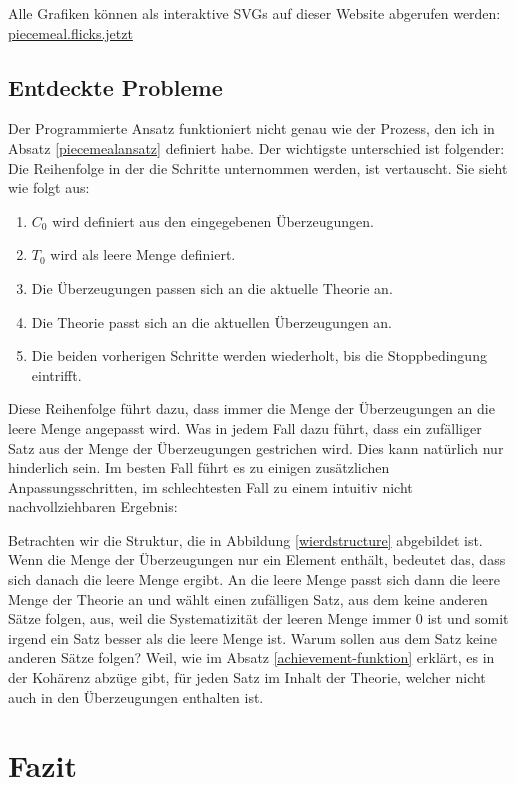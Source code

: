 \documentclass{article}
\begin{document}
Alle Grafiken können als interaktive SVGs auf dieser Website abgerufen werden: \href{https://piecemeal.flicks.jetzt/}{piecemeal.flicks.jetzt}

\subsection{Entdeckte Probleme}
Der Programmierte Ansatz funktioniert nicht genau wie der Prozess, den ich in Absatz \ref{piecemealansatz} definiert habe. Der wichtigste unterschied ist folgender: Die Reihenfolge in der die Schritte unternommen werden, ist vertauscht. Sie sieht wie folgt aus:
\begin{enumerate}
    \item $C_0$ wird definiert aus den eingegebenen Überzeugungen.
    \item $T_0$ wird als leere Menge definiert.
    \item Die Überzeugungen passen sich an die aktuelle Theorie an.
    \item Die Theorie passt sich an die aktuellen Überzeugungen an.
    \item Die beiden vorherigen Schritte werden wiederholt, bis die Stoppbedingung eintrifft.
\end{enumerate}

Diese Reihenfolge führt dazu, dass immer die Menge der Überzeugungen an die leere Menge angepasst wird. Was in jedem Fall dazu führt, dass ein zufälliger Satz aus der Menge der Überzeugungen gestrichen wird. Dies kann natürlich nur hinderlich sein. Im besten Fall führt es zu einigen zusätzlichen Anpassungsschritten, im schlechtesten Fall zu einem intuitiv nicht nachvollziehbaren Ergebnis:

Betrachten wir die Struktur, die in Abbildung \ref{wierdstructure} abgebildet ist. Wenn die Menge der Überzeugungen nur ein Element enthält, bedeutet das, dass sich danach die leere Menge ergibt. An die leere Menge passt sich dann die leere Menge der Theorie an und wählt einen zufälligen Satz, aus dem keine anderen Sätze folgen, aus, weil die Systematizität der leeren Menge immer 0 ist und somit irgend ein Satz besser als die leere Menge ist. Warum sollen aus dem Satz keine anderen Sätze folgen? Weil, wie im Absatz \ref{achievement-funktion} erklärt, es in der Kohärenz abzüge gibt, für jeden Satz im Inhalt der Theorie, welcher nicht auch in den Überzeugungen enthalten ist.


\section{Fazit}
\end{document}

